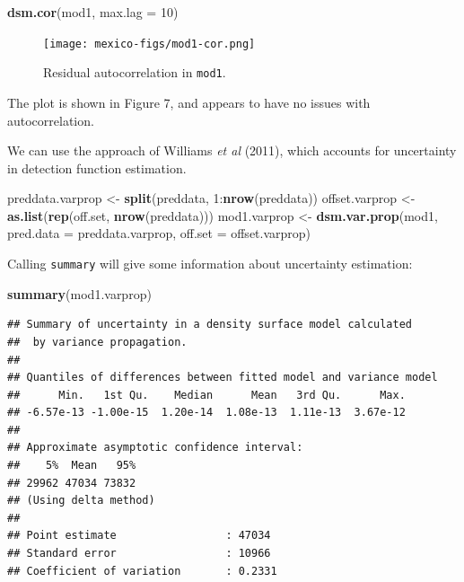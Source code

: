 \documentclass[]{amsart}
\newenvironment{Shaded}{}{}
\newcommand{\KeywordTok}[1]{\textcolor[rgb]{0.00,0.44,0.13}{\textbf{{#1}}}}
\newcommand{\DataTypeTok}[1]{\textcolor[rgb]{0.56,0.13,0.00}{{#1}}}
\newcommand{\DecValTok}[1]{\textcolor[rgb]{0.25,0.63,0.44}{{#1}}}
\newcommand{\StringTok}[1]{\textcolor[rgb]{0.25,0.44,0.63}{{#1}}}
\newcommand{\NormalTok}[1]{{#1}}
\begin{document}
\begin{Shaded}
\begin{Highlighting}[]
\KeywordTok{dsm.cor}\NormalTok{(mod1, }\DataTypeTok{max.lag =} \DecValTok{10}\NormalTok{)}
\end{Highlighting}
\end{Shaded}

\begin{figure}[htbp]
\centering
\texttt{[image: mexico-figs/mod1-cor.png]}
\caption{Residual autocorrelation in \texttt{mod1}.}
\end{figure}

The plot is shown in Figure 7, and appears to have no issues with
autocorrelation.

We can use the approach of Williams \emph{et al} (2011), which accounts
for uncertainty in detection function estimation.

\begin{Shaded}
\begin{Highlighting}[]
\NormalTok{preddata.varprop <-}\StringTok{ }\KeywordTok{split}\NormalTok{(preddata, }\DecValTok{1}\NormalTok{:}\KeywordTok{nrow}\NormalTok{(preddata))}
\NormalTok{offset.varprop <-}\StringTok{ }\KeywordTok{as.list}\NormalTok{(}\KeywordTok{rep}\NormalTok{(off.set, }\KeywordTok{nrow}\NormalTok{(preddata)))}
\NormalTok{mod1.varprop <-}\StringTok{ }\KeywordTok{dsm.var.prop}\NormalTok{(mod1, }\DataTypeTok{pred.data =} \NormalTok{preddata.varprop, }\DataTypeTok{off.set =} \NormalTok{offset.varprop)}
\end{Highlighting}
\end{Shaded}

Calling \texttt{summary} will give some information about uncertainty
estimation:

\begin{Shaded}
\begin{Highlighting}[]
\KeywordTok{summary}\NormalTok{(mod1.varprop)}
\end{Highlighting}
\end{Shaded}

\begin{verbatim}
## Summary of uncertainty in a density surface model calculated
##  by variance propagation.
## 
## Quantiles of differences between fitted model and variance model
##      Min.   1st Qu.    Median      Mean   3rd Qu.      Max. 
## -6.57e-13 -1.00e-15  1.20e-14  1.08e-13  1.11e-13  3.67e-12 
## 
## Approximate asymptotic confidence interval:
##    5%  Mean   95% 
## 29962 47034 73832 
## (Using delta method)
## 
## Point estimate                 : 47034 
## Standard error                 : 10966 
## Coefficient of variation       : 0.2331
\end{verbatim}
\end{document}

